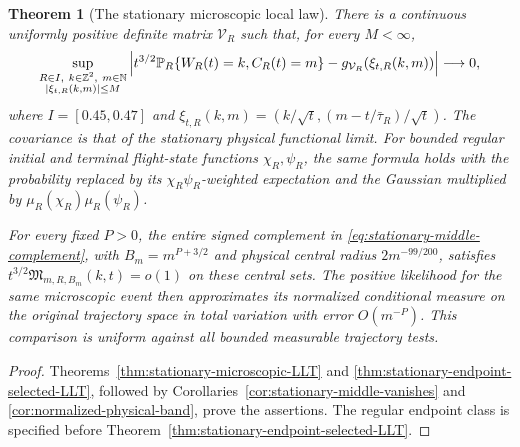 \documentclass[11pt,reqno]{amsart}
\numberwithin{equation}{section}
\newtheorem{leadtheorem}{Theorem}
\theoremstyle{definition}\newtheorem{definition}[theorem]{Definition}
\theoremstyle{remark}\newtheorem{remark}[theorem]{Remark}
\begin{document}
\begin{leadtheorem}[The stationary microscopic local law]
\label{thm:intro-stationary-microscopic}
There is a continuous uniformly positive definite matrix $\mathcal V_R$
such that, for every $M<\infty$,
\begin{equation}\label{eq:intro-stationary-local-law}
 \sup_{\substack{R\in I,\ k\in\mathbb Z^2,\ m\in\mathbb N\\
                     |\xi_{t,R}(k,m)|\le M}}
 \left|t^{3/2}\mathbb P_R\{W_R(t)=k,C_R(t)=m\}
              -g_{\mathcal V_R}(\xi_{t,R}(k,m))\right|\longrightarrow0,
\end{equation}
where $I=[0.45,0.47]$ and
$\xi_{t,R}(k,m)=(k/\sqrt t,(m-t/\bar\tau_R)/\sqrt t)$.
The covariance is that of the stationary physical functional limit.
For bounded regular initial and terminal flight-state functions
$\chi_R,\psi_R$, the same formula holds with the probability replaced
by its $\chi_R\psi_R$-weighted expectation and the Gaussian multiplied
by $\mu_R(\chi_R)\mu_R(\psi_R)$.

For every fixed $P>0$, the entire signed complement in
\eqref{eq:stationary-middle-complement}, with $B_m=m^{P+3/2}$ and
physical central radius $2m^{-99/200}$, satisfies
$t^{3/2}\mathfrak M_{m,R,B_m}(k,t)=o(1)$ on these central sets.
The positive likelihood for the same microscopic event then approximates
its normalized conditional measure on the original trajectory space
in total variation with error $O(m^{-P})$. This comparison is uniform
against all bounded measurable trajectory tests.
\end{leadtheorem}
\begin{proof}
Theorems~\ref{thm:stationary-microscopic-LLT} and
\ref{thm:stationary-endpoint-selected-LLT}, followed by
Corollaries~\ref{cor:stationary-middle-vanishes} and
\ref{cor:normalized-physical-band}, prove the assertions. The regular
endpoint class is specified before
Theorem~\ref{thm:stationary-endpoint-selected-LLT}.
\end{proof}
\end{document}
